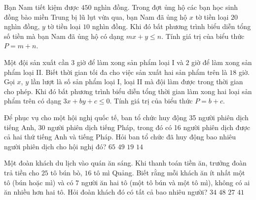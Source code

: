 \begin{bt}
	Bạn Nam tiết kiệm được $450$ nghìn đồng. Trong đợt ủng hộ các bạn học sinh đồng bào miền Trung bị lũ lụt vừa qua, bạn Nam đã ủng hộ $x$ tờ tiền loại $20$ nghìn đồng, $y$ tờ tiền loại $10$ nghìn đồng. Khi đó bất phương trình biểu diễn tổng số tiền mà bạn Nam đã ủng hộ có dạng $mx+y\le n$. Tính giá trị của biểu thức $P=m+n$.
\end{bt}

\begin{bt}
	Một đội sản xuất cần $3$ giờ để làm xong sản phẩm loại I và $2$ giờ để làm xong sản phẩm loại II. Biết thời gian tối đa cho việc sản xuất hai sản phẩm trên là $18$ giờ. Gọi $x$, $y$ lần lượt là số sản phẩm loại I, loại II mà đội làm được trong thời gian cho phép. Khi đó bất phương trình biểu diễn tổng thời gian làm xong hai loại sản phẩm trên có dạng $3x+by+c\le 0$. Tính giá trị của biểu thức $P=b+c$.
\end{bt}
\begin{ex}
Để phục vụ cho một hội nghị quốc tế, ban tổ chức huy động 35 người phiên dịch tiếng Anh, 30 người phiên dịch tiếng Pháp, trong đó có 16 người phiên dịch được cả hai thứ tiếng Anh và tiếng Pháp. Hỏi ban tổ chức đã huy động bao nhiêu người phiên dịch cho hội nghị đó?
\choice
{$65$}
{\True $49$}
{$19$}
{$14$}
\end{ex}

\begin{ex}
Một đoàn khách du lịch vào quán ăn sáng. Khi thanh toán tiền ăn, trưởng đoàn trả tiền cho $25$ tô bún bò, $16$ tô mì Quảng. Biết rằng mỗi khách ăn ít nhất một tô (bún hoặc mì) và có $7$ người ăn hai tô (một tô bún và một tô mì), không có ai ăn nhiều hơn hai tô. Hỏi đoàn khách đó có tất cả bao nhiêu người?
\choice
{\True $34$}
{$48$}
{$27$}
{$41$}
\end{ex}


